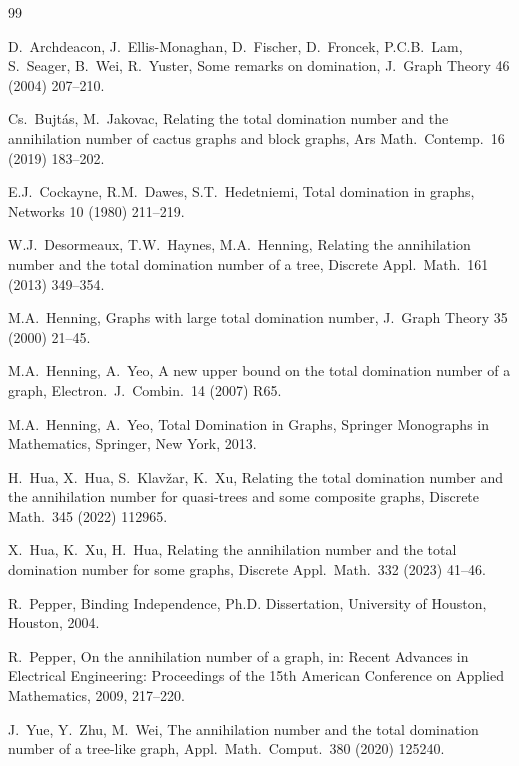 \documentclass[12pt]{article}
\begin{document}
\begin{thebibliography}{99}

D.~Archdeacon, J.~Ellis-Monaghan, D.~Fischer, D.~Froncek, P.C.B.~Lam, S.~Seager, B.~Wei, R.~Yuster,
Some remarks on domination,
J.\ Graph Theory 46 (2004) 207--210.

Cs.~Bujt\'as, M.~Jakovac,
Relating the total domination number and the annihilation number of cactus graphs and block graphs,
Ars Math.\ Contemp.\ 16 (2019) 183--202.

E.J.~Cockayne, R.M.~Dawes, S.T.~Hedetniemi,
Total domination in graphs,
Networks 10 (1980) 211--219.

W.J.~Desormeaux, T.W.~Haynes, M.A.~Henning,
Relating the annihilation number and the total domination number of a tree,
Discrete Appl.\ Math.\ 161 (2013) 349--354.

M.A.~Henning,
Graphs with large total domination number,
J.\ Graph Theory 35 (2000) 21--45.

M.A.~Henning, A.~Yeo,
A new upper bound on the total domination number of a graph,
Electron.\ J.\ Combin.\ 14 (2007) R65.

M.A.~Henning, A.~Yeo,
Total Domination in Graphs,
Springer Monographs in Mathematics, Springer, New York, 2013.

H.~Hua, X.~Hua, S.~Klav\v{z}ar, K.~Xu,
Relating the total domination number and the annihilation number for quasi-trees and some composite graphs,
Discrete Math.\ 345 (2022) 112965.

X.~Hua, K.~Xu, H.~Hua,
Relating the annihilation number and the total domination number for some graphs,
Discrete Appl.\ Math.\ 332 (2023) 41--46.

R.~Pepper,
Binding Independence,
Ph.D. Dissertation, University of Houston, Houston, 2004.

R.~Pepper,
On the annihilation number of a graph,
in: Recent Advances in Electrical Engineering: Proceedings of the 15th American Conference on Applied Mathematics,
2009, 217--220.

J.~Yue, Y.~Zhu, M.~Wei,
The annihilation number and the total domination number of a tree-like graph,
Appl.\ Math.\ Comput.\ 380 (2020) 125240.

\end{thebibliography}
\end{document}
